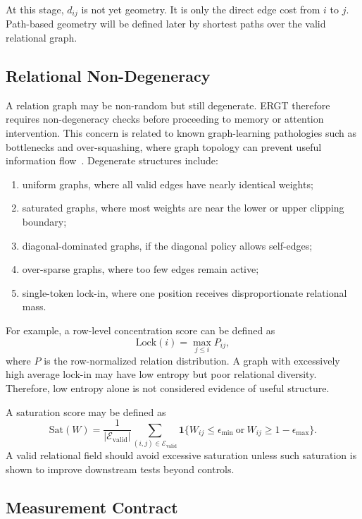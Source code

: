\documentclass[11pt]{article}
\begin{document}
At this stage, $d_{ij}$ is not yet geometry. It is only the direct edge cost from $i$ to $j$. Path-based geometry will be defined later by shortest paths over the valid relational graph.

\subsection{Relational Non-Degeneracy}

A relation graph may be non-random but still degenerate. ERGT therefore requires non-degeneracy checks before proceeding to memory or attention intervention. This concern is related to known graph-learning pathologies such as bottlenecks and over-squashing, where graph topology can prevent useful information flow~\cite{oversquashing2022}. Degenerate structures include:
\begin{enumerate}[label=(\roman*)]
    \item uniform graphs, where all valid edges have nearly identical weights;
    \item saturated graphs, where most weights are near the lower or upper clipping boundary;
    \item diagonal-dominated graphs, if the diagonal policy allows self-edges;
    \item over-sparse graphs, where too few edges remain active;
    \item single-token lock-in, where one position receives disproportionate relational mass.
\end{enumerate}

For example, a row-level concentration score can be defined as
\[
\mathrm{Lock}(i)
=
\max_{j\leq i}P_{ij},
\]
where $P$ is the row-normalized relation distribution. A graph with excessively high average lock-in may have low entropy but poor relational diversity. Therefore, low entropy alone is not considered evidence of useful structure.

A saturation score may be defined as
\[
\mathrm{Sat}(W)
=
\frac{1}{|\mathcal{E}_{\mathrm{valid}}|}
\sum_{(i,j)\in\mathcal{E}_{\mathrm{valid}}}
\mathbf{1}\{W_{ij}\leq \epsilon_{\min}\ \text{or}\ W_{ij}\geq 1-\epsilon_{\max}\}.
\]
A valid relational field should avoid excessive saturation unless such saturation is shown to improve downstream tests beyond controls.

\subsection{Measurement Contract}
\end{document}
